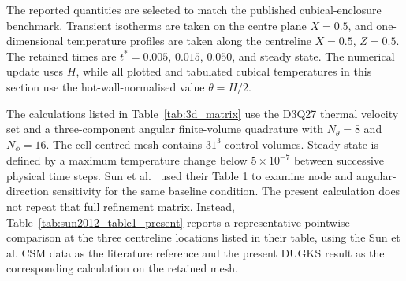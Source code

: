 \documentclass[a4paper,12pt]{ctexart}
\numberwithin{equation}{section}
\begin{document}
The reported quantities are selected to match the published cubical-enclosure benchmark. Transient isotherms are taken on the centre plane $X=0.5$, and one-dimensional temperature profiles are taken along the centreline $X=0.5$, $Z=0.5$. The retained times are $t^*=0.005$, $0.015$, $0.050$, and steady state. The numerical update uses $H$, while all plotted and tabulated cubical temperatures in this section use the hot-wall-normalised value $\theta=H/2$.

\begin{table}[H]
\centering
\scriptsize
\caption{Three-dimensional cubical-enclosure calculation matrix based on Sun et al.~\cite{SunMaLi2012}. The default setting is $\tau_L=1.0$, $\omega=0$, $N_{cr}=0.01$, and black diffuse walls unless otherwise specified.}
\label{tab:3d_matrix}
\end{table}

The calculations listed in Table~\ref{tab:3d_matrix} use the D3Q27 thermal velocity set and a three-component angular finite-volume quadrature with $N_\theta=8$ and $N_\phi=16$. The cell-centred mesh contains $31^3$ control volumes. Steady state is defined by a maximum temperature change below $5\times10^{-7}$ between successive physical time steps. Sun et al.~\cite{SunMaLi2012} used their Table 1 to examine node and angular-direction sensitivity for the same baseline condition. The present calculation does not repeat that full refinement matrix. Instead, Table~\ref{tab:sun2012_table1_present} reports a representative pointwise comparison at the three centreline locations listed in their table, using the Sun et al. CSM data as the literature reference and the present DUGKS result as the corresponding calculation on the retained mesh.
\end{document}
